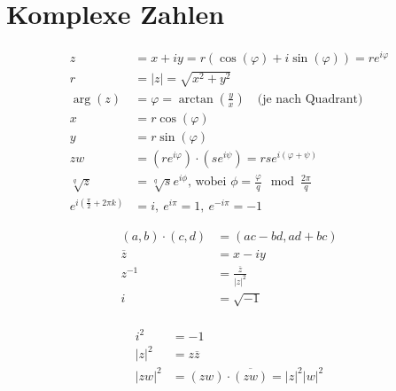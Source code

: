 
\section{Komplexe Zahlen}


%
\begin{minipage}[c]{0.45\textwidth}
	\begin{equation*}
	\begin{split}
	z & = x + iy = r(\cos(\varphi) + i\sin(\varphi)) = re^{i\varphi} \\
	r & = |z| = \sqrt{x^2 + y^2} \\
	\arg(z) & = \varphi  = \arctan(\frac{y}{x}) \quad \text{(je nach Quadrant)}  \\
	x & = r\cos(\varphi) \\
	y & = r\sin(\varphi) \\
	zw & = (re^{i\varphi})\cdot(se^{i\psi}) = rse^{i(\varphi + \psi)} \\
	\sqrt[q]{z} & = \sqrt[q]{s}e^{i\phi}\text{, wobei }\phi = \frac{\varphi}{q} \mod \frac{2\pi}{q} \\
	e^{i(\frac{\pi}{2} + 2\pi k)} & = i,\ e^{i\pi} = 1, \ e^{-i\pi} = -1
	\end{split}
	\end{equation*}
\end{minipage}

\begin{minipage}[c]{0.5\textwidth}
	\begin{equation*}
	\begin{split}
	(a,b) \cdot (c, d) & = (ac-bd, ad+bc) \\
	\overline{z} & = x - iy\\
	z^{-1} & = \frac{\overline{z}}{|z|^2} \\
	i & = \sqrt{-1}\\
	\end{split}
	\end{equation*}
\end{minipage}
%
\begin{minipage}[c]{0.5\textwidth}
	\begin{equation*}
	\begin{split}
	i^2 & = -1 \\
	|z|^2 & = z\overline{z} \\
	|zw|^2 & = (zw) \cdot \overline{(zw)} = |z|^2|w|^2
	\end{split}
	\end{equation*}
\end{minipage}

